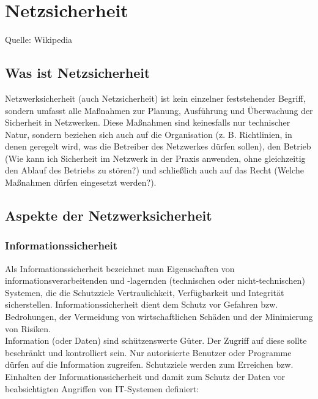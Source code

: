 \chapter{Netzsicherheit}
Quelle: Wikipedia
\section{Was ist Netzsicherheit}
Netzwerksicherheit (auch Netzsicherheit) ist kein einzelner feststehender Begriff, sondern umfasst alle Maßnahmen zur Planung, Ausführung und Überwachung der Sicherheit in Netzwerken. Diese Maßnahmen sind keinesfalls nur technischer Natur, sondern beziehen sich auch auf die Organisation (z. B. Richtlinien, in denen geregelt wird, was die Betreiber des Netzwerkes dürfen sollen), den Betrieb (Wie kann ich Sicherheit im Netzwerk in der Praxis anwenden, ohne gleichzeitig den Ablauf des Betriebs zu stören?) und schließlich auch auf das Recht (Welche Maßnahmen dürfen eingesetzt werden?).
\section{Aspekte der Netzwerksicherheit}
\subsection{Informationssicherheit}
Als Informationssicherheit bezeichnet man Eigenschaften von informationsverarbeitenden und -lagernden (technischen oder nicht-technischen) Systemen, die die Schutzziele Vertraulichkeit, Verfügbarkeit und Integrität sicherstellen. Informationssicherheit dient dem Schutz vor Gefahren bzw. Bedrohungen, der Vermeidung von wirtschaftlichen Schäden und der Minimierung von Risiken.\\

Information (oder Daten) sind schützenswerte Güter. Der Zugriff auf diese sollte beschränkt und kontrolliert sein. Nur autorisierte Benutzer oder Programme dürfen auf die Information zugreifen. Schutzziele werden zum Erreichen bzw. Einhalten der Informationssicherheit und damit zum Schutz der Daten vor beabsichtigten Angriffen von IT-Systemen definiert:

